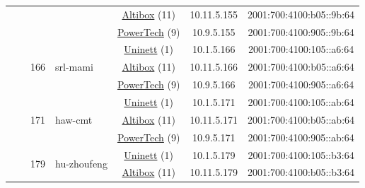 \begin{small}
\begin{center}
\begin{longtable}{|c|c|c|c|c|c|c|c|}
  &  &  &  & \multicolumn{2}{|c|}{\tiny{\href{https://www.altibox.no}{Altibox} (11)}} & \tiny{10.11.5.155} & \tiny{2001:700:4100:b05::9b:64} \\* \cline{5-5}\cline{6-6}\cline{7-7}\cline{8-8}
  &  &  &  & \multicolumn{2}{|c|}{\tiny{\href{http://www.powertech.no}{PowerTech} (9)}} & \tiny{10.9.5.155} & \tiny{2001:700:4100:905::9b:64} \\* \cline{3-3}\cline{4-4}\cline{5-5}\cline{6-6}\cline{7-7}\cline{8-8}
  &  & \multirow{3}{*}{\tiny{166}} & \multicolumn{1}{|l|}{\multirow{3}{*}{\tiny{srl-mami}}} & \multicolumn{2}{|c|}{\tiny{\href{https://www.uninett.no}{Uninett} (1)}} & \tiny{10.1.5.166} & \tiny{2001:700:4100:105::a6:64} \\* \cline{5-5}\cline{6-6}\cline{7-7}\cline{8-8}
  &  &  &  & \multicolumn{2}{|c|}{\tiny{\href{https://www.altibox.no}{Altibox} (11)}} & \tiny{10.11.5.166} & \tiny{2001:700:4100:b05::a6:64} \\* \cline{5-5}\cline{6-6}\cline{7-7}\cline{8-8}
  &  &  &  & \multicolumn{2}{|c|}{\tiny{\href{http://www.powertech.no}{PowerTech} (9)}} & \tiny{10.9.5.166} & \tiny{2001:700:4100:905::a6:64} \\* \cline{3-3}\cline{4-4}\cline{5-5}\cline{6-6}\cline{7-7}\cline{8-8}
  &  & \multirow{3}{*}{\tiny{171}} & \multicolumn{1}{|l|}{\multirow{3}{*}{\tiny{haw-cmt}}} & \multicolumn{2}{|c|}{\tiny{\href{https://www.uninett.no}{Uninett} (1)}} & \tiny{10.1.5.171} & \tiny{2001:700:4100:105::ab:64} \\* \cline{5-5}\cline{6-6}\cline{7-7}\cline{8-8}
  &  &  &  & \multicolumn{2}{|c|}{\tiny{\href{https://www.altibox.no}{Altibox} (11)}} & \tiny{10.11.5.171} & \tiny{2001:700:4100:b05::ab:64} \\* \cline{5-5}\cline{6-6}\cline{7-7}\cline{8-8}
  &  &  &  & \multicolumn{2}{|c|}{\tiny{\href{http://www.powertech.no}{PowerTech} (9)}} & \tiny{10.9.5.171} & \tiny{2001:700:4100:905::ab:64} \\* \cline{3-3}\cline{4-4}\cline{5-5}\cline{6-6}\cline{7-7}\cline{8-8}
  &  & \multirow{3}{*}{\tiny{179}} & \multicolumn{1}{|l|}{\multirow{3}{*}{\tiny{hu-zhoufeng}}} & \multicolumn{2}{|c|}{\tiny{\href{https://www.uninett.no}{Uninett} (1)}} & \tiny{10.1.5.179} & \tiny{2001:700:4100:105::b3:64} \\* \cline{5-5}\cline{6-6}\cline{7-7}\cline{8-8}
  &  &  &  & \multicolumn{2}{|c|}{\tiny{\href{https://www.altibox.no}{Altibox} (11)}} & \tiny{10.11.5.179} & \tiny{2001:700:4100:b05::b3:64} \\* \cline{5-5}\cline{6-6}\cline{7-7}\cline{8-8}

\end{longtable}
\end{center}
\end{small}
